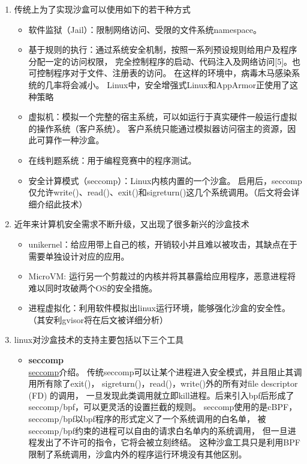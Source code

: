 \documentclass[AutoFakeBold,a4paper]{ctexart}
\begin{document}
\begin{enumerate}

\item 传统上为了实现沙盒可以使用如下的若干种方式
\begin{itemize}
    \item 软件监狱（Jail）：限制网络访问、受限的文件系统namespace。
    \item 基于规则的执行：通过系统安全机制，按照一系列预设规则给用户及程序分配一定的访问权限，
    完全控制程序的启动、代码注入及网络访问[5]。也可控制程序对于文件、注册表的访问。
    在这样的环境中，病毒木马感染系统的几率将会减小。
    Linux中，安全增强式Linux和AppArmor正使用了这种策略
    \item 虚拟机：模拟一个完整的宿主系统，可以如运行于真实硬件一般运行虚拟的操作系统（客户系统）。
    客户系统只能通过模拟器访问宿主的资源，因此可算作一种沙盒。
    \item 在线判题系统：用于编程竞赛中的程序测试。
    \item 安全计算模式（seccomp）：Linux内核内置的一个沙盒。
    启用后，seccomp仅允许write()、read()、exit()和sigreturn()这几个系统调用。（后文将会详细介绍此技术）

\end{itemize}

\item 近年来计算机安全需求不断升级，又出现了很多新兴的沙盒技术
\begin{itemize}
    \item unikernel：给应用带上自己的核，开销较小并且难以被攻击，其缺点在于需要单独设计对应的应用。
    \item MicroVM: 运行另一个剪裁过的内核并将其暴露给应用程序，恶意进程将难以同时攻破两个OS的安全措施。
    \item 进程虚拟化：利用软件模拟出linux运行环境，能够强化沙盒的安全性。（其安利gvisor将在后文被详细分析）
\end{itemize}

\item linux对沙盒技术的支持主要包括以下三个工具
\begin{itemize}
    \item \textbf{seccomp}\\
    \href{https://en.wikipedia.org/wiki/Seccomp}{seccomp}介绍。
    传统seccomp可以让某个进程进入安全模式，并且阻止其调用所有除了exit()，
    sigreturn()，read()，write()外的所有对file descriptor (FD) 的调用，
    一旦发现此类调用就立即kill进程。后来引入bpf后形成了seccomp/bpf，可以更灵活的设置拦截的规则。
    seccomp使用的是cBPF\cite{calavera2019linux}，
    seccomp/bpf以bpf程序的形式定义了一个系统调用的白名单，
    被seccomp/bpf约束的进程可以自由的请求白名单内的系统调用，
    但一旦进程发出了不许可的指令，它将会被立刻终结。
    这种沙盒工具只是利用BPF限制了系统调用，沙盒内外的程序运行环境没有其他区别。
    \cite{2020SandboxLinux}


\end{itemize}
\end{enumerate}
\end{document}
